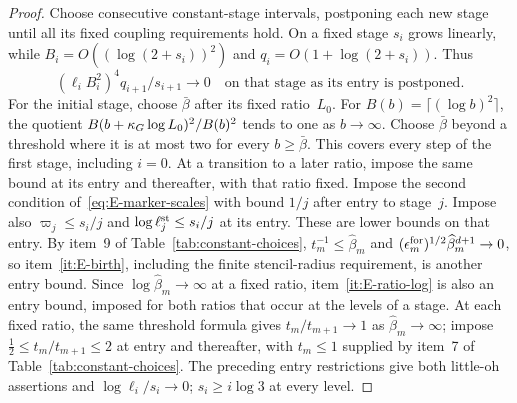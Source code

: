 \begin{proof}
Choose consecutive constant-stage intervals, postponing each new stage until all its fixed coupling requirements hold. On a fixed stage $s_i$ grows linearly, while $B_i=O((\log(2+s_i))^2)$ and $q_i=O(1+\log(2+s_i))$. Thus
\begin{equation*}
 (\ell_iB_i^2)^4q_{i+1}/s_{i+1}\longrightarrow0
 \quad\text{on that stage as its entry is postponed}.
\end{equation*}
For the initial stage, choose $\bar\beta$ after its fixed ratio~$L_0$. For $B(b)=\lceil(\log b)^2\rceil$, the quotient $B(b+\kappa_G\log L_0)^2/B(b)^2$ tends to one as $b\to\infty$. Choose $\bar\beta$ beyond a threshold where it is at most two for every $b\ge\bar\beta$. This covers every step of the first stage, including $i=0$. At a transition to a later ratio, impose the same bound at its entry and thereafter, with that ratio fixed. Impose the second condition of~\eqref{eq:E-marker-scales} with bound $1/j$ after entry to stage~$j$. Impose also $\varpi_j\le s_i/j$ and $\log\ell_j^{\rm st}\le s_i/j$ at its entry. These are lower bounds on that entry. By item~9 of Table~\ref{tab:constant-choices}, $t_m^{-1}\le\widehat\beta_m$ and $(\epsilon_m^{\rm for})^{1/2}\widehat\beta_m^{d+1}\to0$, so item~\ref{it:E-birth}, including the finite stencil-radius requirement, is another entry bound. Since $\log\widehat\beta_m\to\infty$ at a fixed ratio, item~\ref{it:E-ratio-log} is also an entry bound, imposed for both ratios that occur at the levels of a stage. At each fixed ratio, the same threshold formula gives $t_m/t_{m+1}\to1$ as $\widehat\beta_m\to\infty$; impose $\tfrac12\le t_m/t_{m+1}\le2$ at entry and thereafter, with $t_m\le1$ supplied by item~7 of Table~\ref{tab:constant-choices}. The preceding entry restrictions give both little-oh assertions and $\log\ell_i/s_i\to0$; $s_i\ge i\log3$ at every level.


\end{proof}
